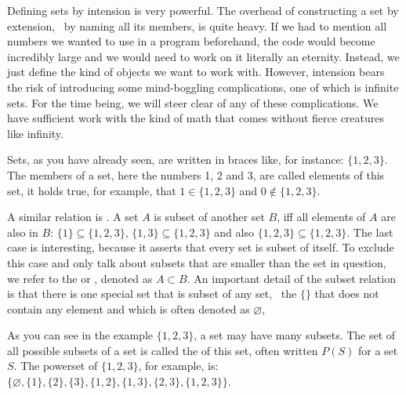 \documentclass{scrreprt}
\begin{document}
Defining sets by intension is 
very powerful. 
The overhead of constructing a set by extension,
\ie\ by naming all its members,
is quite heavy.
If we had to mention all numbers we wanted to use
in a program beforehand, the code would become incredibly large
and we would need to work on it literally an eternity.
Instead, we just define the kind of objects we want to work with.
However, intension bears the risk
of introducing some mind-boggling complications,
one of which is infinite sets.
For the time being, 
we will steer clear of any of these complications.
We have sufficient work with the kind of math
that comes without fierce creatures like infinity.

Sets, as you have already seen, are written in braces
like, for instance:
$\lbrace 1,2,3\rbrace$.
The members of a set, here the numbers 1, 2 and 3,
are called elements of this set,
it holds true, for example, that
$1 \in \lbrace 1,2,3\rbrace$ and 
$0 \not\in \lbrace 1,2,3\rbrace$.

A similar relation is .
A set $A$ is subset of another set $B$, iff
all elements of $A$ are also in $B$:
$\lbrace 1\rbrace \subseteq \lbrace 1,2,3\rbrace$,
$\lbrace 1,3\rbrace \subseteq \lbrace 1,2,3\rbrace$
and also
$\lbrace 1,2,3\rbrace \subseteq \lbrace 1,2,3\rbrace$.
The last case is interesting,
because it asserts that every set is subset of itself.
To exclude this case and only talk about subsets
that are smaller than the set in question,
we refer to the  or ,
denoted as $A \subset B$.
An important detail of the subset relation is
that there is one special set that is subset of any set,
\viz\ the  $\lbrace\rbrace$
that does not contain any element and which is 
often denoted as $\varnothing$,

As you can see in the example $\lbrace 1,2,3\rbrace$,
a set may have many subsets.
The set of all possible subsets of a set
is called the  of this set,
often written $P(S)$ for a set $S$.
The powerset of $\lbrace 1,2,3\rbrace$, for example, is:
$\lbrace
\varnothing,
\lbrace 1\rbrace,
\lbrace 2\rbrace,
\lbrace 3\rbrace,
\lbrace 1,2\rbrace,
\lbrace 1,3\rbrace,
\lbrace 2,3\rbrace,
\lbrace 1,2,3\rbrace\rbrace$.
\end{document}
